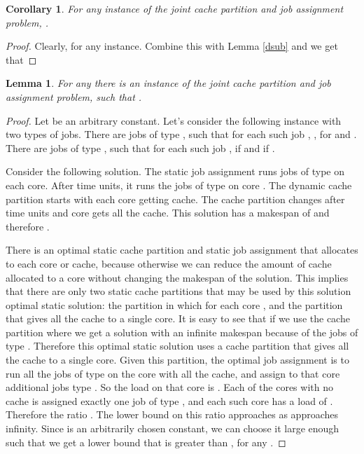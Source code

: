 \documentclass[11pt]{article}
\newtheorem{corollary}[theorem]{Corollary}
\newtheorem{lemma}[theorem]{Lemma}
\begin{document}
\begin{corollary}
For any instance of the joint cache partition and job assignment problem,
 .
\end{corollary}
\begin{proof}
Clearly,  for any instance. Combine this with Lemma \ref{dsub} and we get that 
\end{proof}


\begin{lemma}\label{dslb}
For any  there is an instance of the joint cache partition and job assignment problem, such that .
\end{lemma}
\begin{proof}
Let  be an arbitrary constant.
Let's consider the following instance with two types of jobs.
There are  jobs of type , such that for each such job , , for  and .
There are  jobs of type , such that for each such job ,  if  and  if .

Consider the following solution. The static job assignment runs  jobs of type  on each core. After  time units, it runs the  jobs of type  on core .
The dynamic cache partition starts with each core getting  cache. The cache partition changes after  time units and core  gets all the cache.
This solution has a makespan of  and therefore .

There is an optimal static cache partition and static job assignment that allocates to each core  or  cache, because otherwise we can reduce the amount of cache allocated to a core without changing the makespan of the solution.
This implies that there are only two static cache partitions that may be used by this solution optimal static solution: the partition in which  for each core , and the partition that gives all the cache to a single core.
It is easy to see that if we use the cache partition where  we get a solution with an infinite makespan because of the jobs of type .
Therefore this optimal static solution uses a cache partition that gives all the cache to a single core.
Given this partition, the optimal job assignment is to run all the  jobs of type  on the core with all the cache, and assign to that core additional   jobs type .
So the load on that core is .
Each of the  cores with no cache is assigned exactly one job of type , and each such core has a load of .
Therefore the ratio  . The lower  bound on this ratio approaches  as  approaches infinity.
Since  is an arbitrarily chosen constant, we can choose it large enough such that we get a lower bound that is greater than , for any .
\end{proof}
\end{document}
